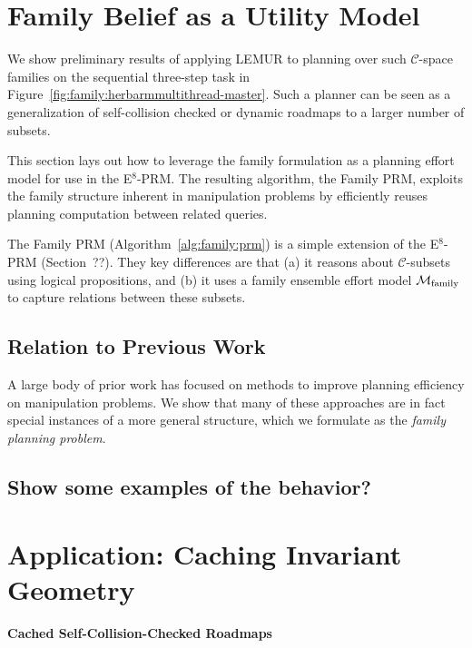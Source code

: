 \section{Family Belief as a Utility Model}

We show preliminary results of applying LEMUR to planning over
such $\mathcal{C}$-space families on the sequential
three-step task in
Figure~\ref{fig:family:herbarmmultithread-master}.
Such a planner can be seen as a generalization of self-collision checked
\citep{leven2002changing} or dynamic \citep{jaillet2004dynamicprm}
roadmaps to a larger number of subsets.

This section lays out how to leverage the family formulation
as a planning effort model
for use in the E$^8$-PRM.
The resulting algorithm,
the Family PRM,
exploits the family structure inherent in manipulation problems
by efficiently reuses planning computation between related queries.

The Family PRM (Algorithm~\ref{alg:family:prm}) is a simple
extension of the \mbox{E$^8$-PRM}
(Section~??).
They key differences are that
(a) it reasons about $\mathcal{C}$-subsets
using logical propositions,
and (b) it uses a family ensemble effort model
$\mathcal{M}_{\mbox{\scriptsize family}}$ to capture relations
between these subsets.

\subsection{Relation to Previous Work}

A large body of prior work has focused on methods to
improve planning efficiency on manipulation problems.
We show that many of these approaches are
in fact special instances of a more general structure,
which we formulate as the \emph{family planning problem}.

\subsection{Show some examples of the behavior?}

\section{Application: Caching Invariant Geometry}

\paragraph{Cached Self-Collision-Checked Roadmaps}
\label{subsec:family:cached-self-valid}

